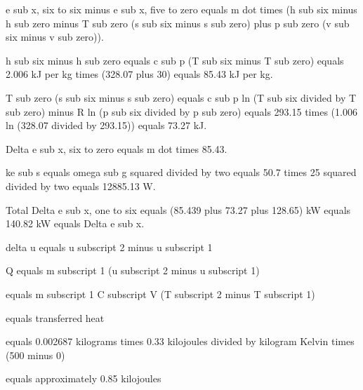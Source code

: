 e sub x, six to six minus e sub x, five to zero equals m dot times (h sub six minus h sub zero minus T sub zero (s sub six minus s sub zero) plus p sub zero (v sub six minus v sub zero)).

h sub six minus h sub zero equals c sub p (T sub six minus T sub zero) equals 2.006 kJ per kg times (328.07 plus 30) equals 85.43 kJ per kg.

T sub zero (s sub six minus s sub zero) equals c sub p ln (T sub six divided by T sub zero) minus R ln (p sub six divided by p sub zero) equals 293.15 times (1.006 ln (328.07 divided by 293.15)) equals 73.27 kJ.

Delta e sub x, six to zero equals m dot times 85.43.

ke sub s equals omega sub g squared divided by two equals 50.7 times 25 squared divided by two equals 12885.13 W.

Total Delta e sub x, one to six equals (85.439 plus 73.27 plus 128.65) kW equals 140.82 kW equals Delta e sub x.

delta u equals u subscript 2 minus u subscript 1

Q equals m subscript 1 (u subscript 2 minus u subscript 1)

equals m subscript 1 C subscript V (T subscript 2 minus T subscript 1)

equals transferred heat

equals 0.002687 kilograms times 0.33 kilojoules divided by kilogram Kelvin times (500 minus 0)

equals approximately 0.85 kilojoules